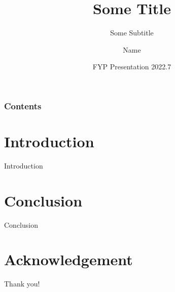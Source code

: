 \documentclass[10pt]{beamer}
\title[City University of Hong Kong]{Some Title
}
\subtitle{Some Subtitle}
\author[abc2-c]{Name}
\institute[@my.cityu.edu.hk]{ City University of Hong Kong}
\date[FYP Presentation 2022.7]
{FYP Presentation 2022.7}
\begin{document}
\frame{\titlepage}
\begin{frame}
\frametitle{Contents}
\tableofcontents
\end{frame}
\section{Introduction}
    \begin{frame}{Introduction}
    \end{frame}


\section{Conclusion}
    \begin{frame}{Conclusion}
    \end{frame}



\section*{Acknowledgement}  
\begin{frame}
\textcolor{myNewColorA}{\Huge{\centerline{Thank you!}}}
\end{frame}
\end{document}

